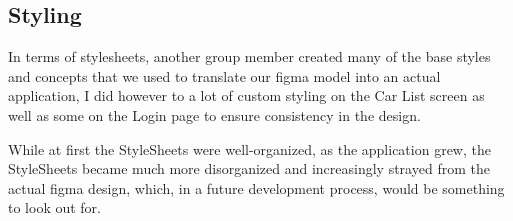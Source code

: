 \subsection*{Styling}
In terms of stylesheets, another group member created many of the base styles and concepts that we used to translate our figma model into an actual application, I did however to a lot of custom styling on the Car List screen as well as some on the Login page to ensure consistency in the design.

While at first the StyleSheets were well-organized, as the application grew, the StyleSheets became much more disorganized and increasingly strayed from the actual figma design, which, in a future development process, would be something to look out for.